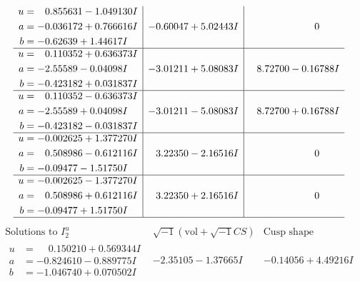 \documentclass[1p]{elsarticle_modified}
\theoremstyle{definition}
\newcommand{\I}{\sqrt{-1}}
\begin{document}
$$\begin{array}{c|c|c}
\begin{aligned}
u &= \phantom{-}0.855631 - 1.049130 I \\
a &= -0.036172 + 0.766616 I \\
b &= -0.62639 + 1.44617 I\end{aligned}
 & -0.60047 + 5.02443 I & \phantom{-0.000000 } 0 \\ \hline\begin{aligned}
u &= \phantom{-}0.110352 + 0.636373 I \\
a &= -2.55589 - 0.04098 I \\
b &= -0.423182 + 0.031837 I\end{aligned}
 & -3.01211 + 5.08083 I & \phantom{-}8.72700 - 0.16788 I \\ \hline\begin{aligned}
u &= \phantom{-}0.110352 - 0.636373 I \\
a &= -2.55589 + 0.04098 I \\
b &= -0.423182 - 0.031837 I\end{aligned}
 & -3.01211 - 5.08083 I & \phantom{-}8.72700 + 0.16788 I \\ \hline\begin{aligned}
u &= -0.002625 + 1.377270 I \\
a &= \phantom{-}0.508986 - 0.612116 I \\
b &= -0.09477 - 1.51750 I\end{aligned}
 & \phantom{-}3.22350 - 2.16516 I & \phantom{-0.000000 } 0 \\ \hline\begin{aligned}
u &= -0.002625 - 1.377270 I \\
a &= \phantom{-}0.508986 + 0.612116 I \\
b &= -0.09477 + 1.51750 I\end{aligned}
 & \phantom{-}3.22350 + 2.16516 I & \phantom{-0.000000 } 0\\
 \hline 
 \end{array}$$\newpage$$\begin{array}{c|c|c}  
\text{Solutions to }I^u_{2}& \I (\text{vol} + \sqrt{-1}CS) & \text{Cusp shape}\\
 \hline 
\begin{aligned}
u &= \phantom{-}0.150210 + 0.569344 I \\
a &= -0.824610 - 0.889775 I \\
b &= -1.046740 + 0.070502 I\end{aligned}
 & -2.35105 - 1.37665 I & -0.14056 + 4.49216 I \\ \hline\begin{aligned}

\end{aligned}
\end{array}$$
\end{document}
